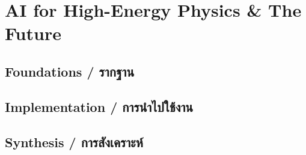 \chapter{AI for High-Energy Physics \& The Future}
\label{ch:future_ai_physics}

\section{Foundations \quad / \quad \textthai{รากฐาน}}



\section{Implementation \quad / \quad \textthai{การนำไปใช้งาน}}



\section{Synthesis \quad / \quad \textthai{การสังเคราะห์}}



